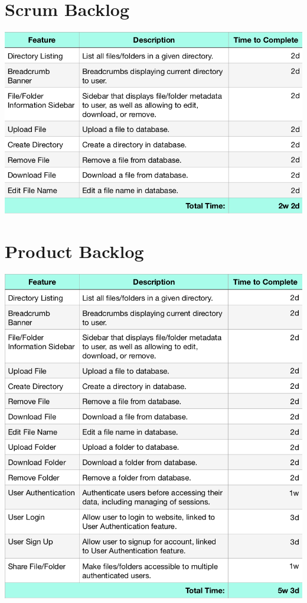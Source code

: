 \documentclass[12pt]{report}
\begin{document}
%
%
\section*{Scrum Backlog}
\begin{center}
    \includegraphics[width=1\textwidth]{images/scrum-backlog.png}
\end{center}

%
%
\section*{Product Backlog}
\begin{center}
    \includegraphics[width=1\textwidth]{images/product-backlog.png}
\end{center}

\pagebreak
\end{document}

